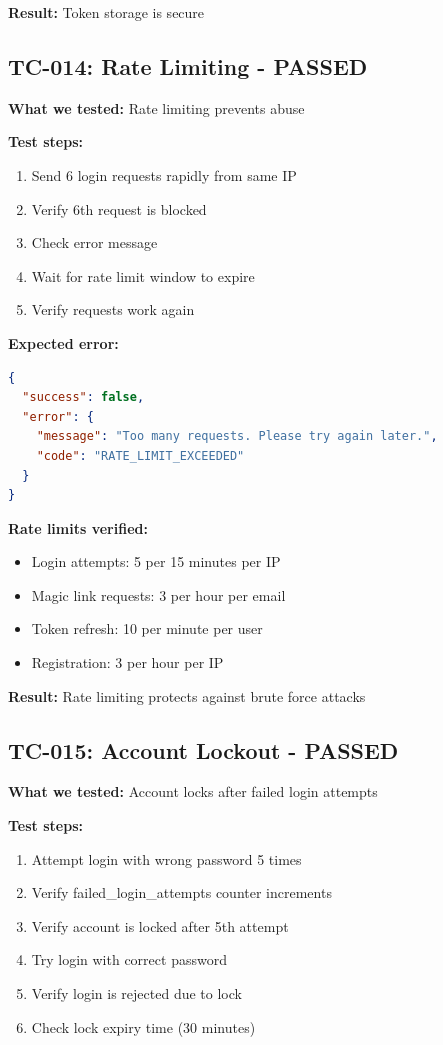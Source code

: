 \documentclass[11pt,a4paper]{article}
\begin{document}
\textbf{Result:} Token storage is secure

\subsection{TC-014: Rate Limiting - PASSED}
\textbf{What we tested:} Rate limiting prevents abuse

\textbf{Test steps:}
\begin{enumerate}
    \item Send 6 login requests rapidly from same IP
    \item Verify 6th request is blocked
    \item Check error message
    \item Wait for rate limit window to expire
    \item Verify requests work again
\end{enumerate}

\textbf{Expected error:}
\begin{lstlisting}[language=json]
{
  "success": false,
  "error": {
    "message": "Too many requests. Please try again later.",
    "code": "RATE_LIMIT_EXCEEDED"
  }
}
\end{lstlisting}

\textbf{Rate limits verified:}
\begin{itemize}
    \item Login attempts: 5 per 15 minutes per IP
    \item Magic link requests: 3 per hour per email
    \item Token refresh: 10 per minute per user
    \item Registration: 3 per hour per IP
\end{itemize}

\textbf{Result:} Rate limiting protects against brute force attacks

\subsection{TC-015: Account Lockout - PASSED}
\textbf{What we tested:} Account locks after failed login attempts

\textbf{Test steps:}
\begin{enumerate}
    \item Attempt login with wrong password 5 times
    \item Verify failed\_login\_attempts counter increments
    \item Verify account is locked after 5th attempt
    \item Try login with correct password
    \item Verify login is rejected due to lock
    \item Check lock expiry time (30 minutes)
\end{enumerate}
\end{document}
